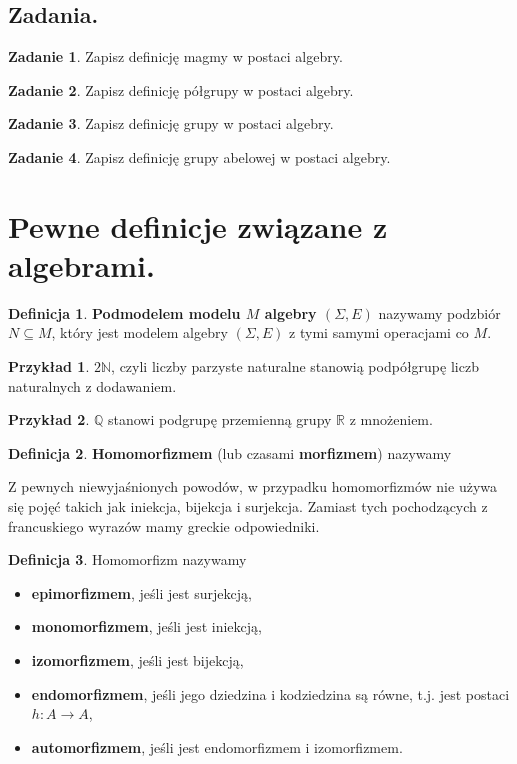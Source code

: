 \documentclass{article}
\theoremstyle{definition}
\newtheorem{definition}{Definicja}[section]
\newtheorem{example}{Przykład}[section]
\newtheorem{exercise}{Zadanie}[section]
\begin{document}
\subsection{Zadania.}

\begin{exercise}
	Zapisz definicję magmy w postaci algebry.
\end{exercise}
\begin{exercise}
	Zapisz definicję półgrupy w postaci algebry.
\end{exercise}
\begin{exercise}
	Zapisz definicję grupy w postaci algebry.
\end{exercise}
\begin{exercise}
	Zapisz definicję grupy abelowej w postaci algebry.
\end{exercise}

\section{Pewne definicje związane z algebrami.}

\begin{definition}
    \textbf{Podmodelem modelu $M$ algebry $(\Sigma, E)$} nazywamy podzbiór $N \subseteq M$,
		który jest modelem algebry $(\Sigma, E)$ z tymi samymi operacjami co $M$.
\end{definition}

\begin{example}
	$2\mathbb{N}$, czyli liczby parzyste naturalne stanowią podpółgrupę liczb naturalnych z dodawaniem.
\end{example}
\begin{example}
	$\mathbb{Q}$ stanowi podgrupę przemienną grupy $\mathbb{R}$ z mnożeniem.
\end{example}

\begin{definition}
    \textbf{Homomorfizmem} (lub czasami \textbf{morfizmem}) nazywamy
\end{definition}

Z pewnych niewyjaśnionych powodów,
    w przypadku homomorfizmów nie używa się pojęć takich jak iniekcja, bijekcja i surjekcja.
Zamiast tych pochodzących z francuskiego wyrazów mamy greckie odpowiedniki.

\begin{definition}
    Homomorfizm nazywamy
    \begin{itemize}
        \item \textbf{epimorfizmem}, jeśli jest surjekcją,
        \item \textbf{monomorfizmem}, jeśli jest iniekcją,
        \item \textbf{izomorfizmem}, jeśli jest bijekcją,
        \item \textbf{endomorfizmem}, jeśli jego dziedzina i kodziedzina są równe, t.j. jest postaci $h:A \to A$,
        \item \textbf{automorfizmem}, jeśli jest endomorfizmem i izomorfizmem.
    \end{itemize}
\end{definition}
\end{document}
